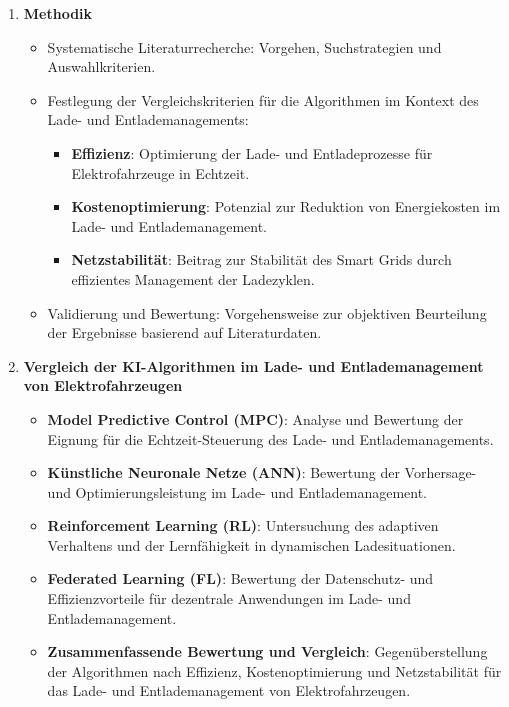 \documentclass[12pt]{article} %
\begin{document}
\begin{enumerate}
    \item \textbf{Methodik}
        \begin{itemize}
            \item Systematische Literaturrecherche: Vorgehen, Suchstrategien und Auswahlkriterien.
            \item Festlegung der Vergleichskriterien für die Algorithmen im Kontext des Lade- und Entlademanagements:
                \begin{itemize}
                    \item \textbf{Effizienz}: Optimierung der Lade- und Entladeprozesse für Elektrofahrzeuge in Echtzeit.
                    \item \textbf{Kostenoptimierung}: Potenzial zur Reduktion von Energiekosten im Lade- und Entlademanagement.
                    \item \textbf{Netzstabilität}: Beitrag zur Stabilität des Smart Grids durch effizientes Management der Ladezyklen.
                \end{itemize}
            \item Validierung und Bewertung: Vorgehensweise zur objektiven Beurteilung der Ergebnisse basierend auf Literaturdaten.
        \end{itemize}
        
    \item \textbf{Vergleich der KI-Algorithmen im Lade- und Entlademanagement von Elektrofahrzeugen}
        \begin{itemize}
            \item \textbf{Model Predictive Control (MPC)}: Analyse und Bewertung der Eignung für die Echtzeit-Steuerung des Lade- und Entlademanagements.
            \item \textbf{Künstliche Neuronale Netze (ANN)}: Bewertung der Vorhersage- und Optimierungsleistung im Lade- und Entlademanagement.
            \item \textbf{Reinforcement Learning (RL)}: Untersuchung des adaptiven Verhaltens und der Lernfähigkeit in dynamischen Ladesituationen.
            \item \textbf{Federated Learning (FL)}: Bewertung der Datenschutz- und Effizienzvorteile für dezentrale Anwendungen im Lade- und Entlademanagement.
            \item \textbf{Zusammenfassende Bewertung und Vergleich}: Gegenüberstellung der Algorithmen nach Effizienz, Kostenoptimierung und Netzstabilität für das Lade- und Entlademanagement von Elektrofahrzeugen.
        \end{itemize}
        

\end{enumerate}
\end{document}
